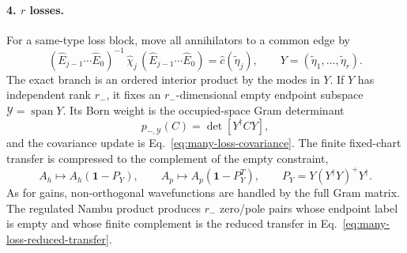 \documentclass[aps,prb,onecolumn,nofootinbib,superscriptaddress]{revtex4-2}
\newcommand{\I}{\mathbf{1}}
\theoremstyle{plain}
\theoremstyle{definition}
\begin{document}
\paragraph*{4. \(r\) losses.}
For a same-type loss block, move all annihilators to a common edge by
\begin{equation}
  (\hat E_{j-1}\cdots\hat E_0)^{-1}\,\hat\chi_j\,
  (\hat E_{j-1}\cdots\hat E_0)
  =
  \hat c(\tilde\eta_j),
  \qquad
  Y=(\tilde\eta_1,\ldots,\tilde\eta_r).
  \label{eq:many-loss-transported-modes}
\end{equation}
The exact branch is an ordered interior product by the modes in \(Y\).  If
\(Y\) has independent rank \(r_-\), it fixes an \(r_-\)-dimensional empty
endpoint subspace \(\mathcal Y=\operatorname{span}Y\).  Its Born weight is
the occupied-space Gram determinant
\begin{equation}
  p_{-,\mathcal Y}(C)
  =
  \det\!\left[Y^\dagger C Y\right],
  \label{eq:many-loss-born-limit}
\end{equation}
and the covariance update is Eq.~\eqref{eq:many-loss-covariance}.  The
finite fixed-chart transfer is compressed to the complement of the empty
constraint,
\begin{equation}
  A_h\mapsto A_h(\I-P_Y),
  \qquad
  A_p\mapsto A_p(\I-P_Y^T),
  \qquad
  P_Y=Y(Y^\dagger Y)^+Y^\dagger .
  \label{eq:many-loss-reduced-transfer}
\end{equation}
As for gains, non-orthogonal wavefunctions are handled by the full Gram
matrix.  The regulated Nambu product produces \(r_-\) zero/pole pairs whose
endpoint label is empty and whose finite complement is the reduced transfer
in Eq.~\eqref{eq:many-loss-reduced-transfer}.
\end{document}
